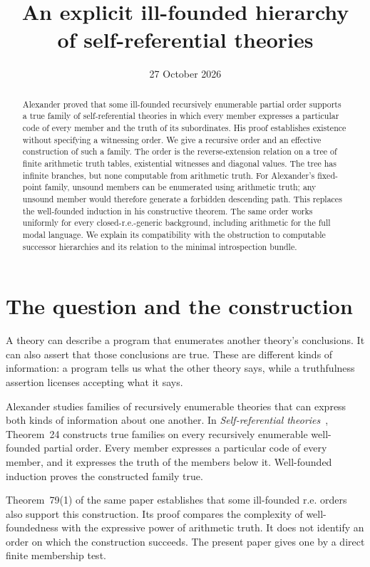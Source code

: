 \documentclass[11pt]{article}
\title{An explicit ill-founded hierarchy\protect\\of self-referential theories}
\author{}
\date{27 October 2026}
\theoremstyle{definition}
\begin{document}
\maketitle

\begin{abstract}
Alexander proved that some ill-founded recursively enumerable partial order
supports a true family of self-referential theories in which every member
expresses a particular code of every member and the truth of its subordinates.
His proof establishes existence without specifying a witnessing order. We give
a recursive order and an effective construction of such a family. The order is
the reverse-extension relation on a tree of finite arithmetic truth tables,
existential witnesses and diagonal values. The tree has infinite branches,
but none computable from arithmetic truth. For Alexander's fixed-point family,
unsound members can be enumerated using arithmetic truth; any unsound member
would therefore generate a forbidden descending path. This replaces the
well-founded induction in his constructive theorem. The same order works
uniformly for every closed-r.e.-generic background, including arithmetic for
the full modal language. We explain its compatibility with the obstruction to
computable successor hierarchies and its relation to the minimal introspection
bundle.
\end{abstract}

\section{The question and the construction}\label{sec:introduction}

A theory can describe a program that enumerates another theory's conclusions.
It can also assert that those conclusions are true. These are different kinds
of information: a program tells us what the other theory says, while a
truthfulness assertion licenses accepting what it says.

Alexander studies families of recursively enumerable theories that can express
both kinds of information about one another. In \emph{Self-referential
theories}~\cite{alexander}, Theorem~24 constructs true families on every
recursively enumerable well-founded partial order. Every member expresses a
particular code of every member, and it expresses the truth of the members
below it. Well-founded induction proves the constructed family true.

Theorem~79(1) of the same paper establishes that some ill-founded r.e. orders
also support this construction. Its proof compares the complexity of
well-foundedness with the expressive power of arithmetic truth. It does not
identify an order on which the construction succeeds. The present paper gives
one by a direct finite membership test.
\end{document}
